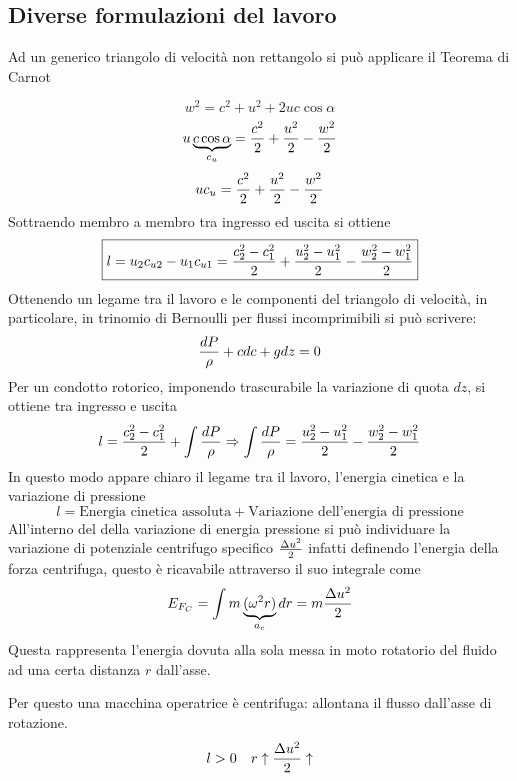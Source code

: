 \documentclass[a4paper, 15pt]{article}
\begin{document}
\newpage

\subsection{Diverse formulazioni del lavoro} 
\begin{adjustwidth}{2in}{}
	Ad un generico triangolo di velocità non rettangolo si può applicare il Teorema di Carnot
	

	\[w^2 = c^2 + u^2 + 2uc\cos\alpha\]	
	\[u\underbrace{c\cos\alpha}_{c_u} = {c^2\over2} + {u^2\over2} - {w^2\over2}\]		
	\[uc_u = {c^2\over2} + {u^2\over2} - {w^2\over2}\]
	Sottraendo membro a membro tra ingresso ed uscita si ottiene 
	\begin{equation}
		\boxed{l = u_2c_{u2} - u_1c_{u1} = {c_2^2 - c_1^2 \over2} + {u_2^2-u_1^2\over2} - {w_2^2 - w_1^2\over2}}
	\end{equation}
	Ottenendo un legame tra il lavoro e le componenti del triangolo di velocità, in particolare, in trinomio di Bernoulli per flussi incomprimibili si può scrivere: 
	\[{dP\over\rho} + cdc + gdz = 0\]
	Per un condotto rotorico, imponendo trascurabile la variazione di quota $dz$, si ottiene tra ingresso e uscita
	\[l = {c_2^2 - c_1^2 \over2} + \int{dP\over\rho} \Rightarrow \int{dP\over\rho} = {u_2^2-u_1^2\over2} - {w_2^2 - w_1^2\over2} \]
	In questo modo appare chiaro il legame tra il lavoro, l'energia cinetica e la variazione di pressione
	\[l = \text{Energia cinetica assoluta} + \text{Variazione dell'energia di pressione}\]
	All'interno del della variazione di energia pressione si può individuare la variazione di potenziale centrifugo specifico \( \Delta u^2\over2\) infatti definendo l'energia della forza centrifuga, questo è ricavabile attraverso il suo integrale come 
	\[E_{F_C} = \int m\underbrace{(\omega^2r)}_{a_c}dr = m {\Delta u^2\over2}\]
	Questa rappresenta l'energia dovuta alla sola messa in moto rotatorio del fluido ad una certa distanza $r$ dall'asse. 
	
	Per questo una macchina operatrice è centrifuga: allontana il flusso dall'asse di rotazione.
	\[l>0 \quad r\uparrow{\Delta u^2\over2}\uparrow \]
	

\end{adjustwidth}
\end{document}
